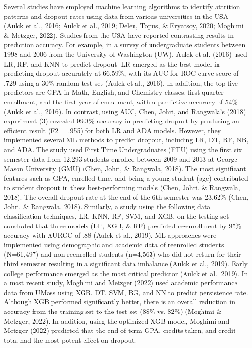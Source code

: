 \documentclass[notitlepage,12pt]{jedm}
\begin{document}
\par Several studies have employed machine learning algorithms to identify attrition patterns and dropout rates using data from various universities in the USA (Aulck et al., 2016; Aulck et al., 2019; Delen, Topus, \& Eryarsoy, 2020; Moghimi \& Metzger, 2022).  Studies from the USA have reported contrasting results in prediction accuracy.  For example, in a survey of undergraduate students between 1998 and 2006 from the University of Washington (UW), Aulck et al. (2016) used LR, RF, and KNN to predict dropout.  LR emerged as the best model in predicting dropout accurately at 66.59\%, with its AUC for ROC curve score of .729 using a 30\% random test set (Aulck et al., 2016).  In addition, the top five predictors are GPA in Math, English, and Chemistry classes, first-quarter enrollment, and the first year of enrollment, with a predictive accuracy of 54\% (Aulck et al., 2016).  In contrast, using AUC, Chen, Johri, and Rangwala’s (2018) experiment (3) revealed 99.3\% accuracy in predicting dropout by producing an efficient result (F2 = .955) for both LR and ADA models.  However, they implemented several ML methods to predict dropout, including LR, DT, RF, NB, and ADA.  The study used First Time Undergraduates (FTU) using the first six semester data from 12,293 students enrolled between 2009 and 2013 at George Mason University (GMU) (Chen, Johri, \& Rangwala, 2018).  The most significant features such as GPA, enrolled time, and being a young student (age) contributed to student dropout in these best-performing models (Chen, Johri, \& Rangwala, 2018).  The overall dropout rate at the end of the 6th semester was 23.62\% (Chen, Johri, \& Rangwala, 2018).  Similarly, a study using the following data classification techniques, LR, KNN, RF, SVM, and XGB, on the testing set concluded that three models (LR, XGB, \& RF) predicted re-enrollment by 95\% accuracy with AUROC of .88  (Aulck et al., 2019).  ML approaches were implemented using demographic and academic data of reenrolled students (N=61,497) and non-reenrolled students (n=4,563) who did not return for their third semester resulting in a significant data imbalance (Aulck et al., 2019).  Early college performance emerged as the most critical predictor (Aulck et al., 2019).  In a most recent study, Moghimi and Metzger (2022) used academic performance data from UMass using XGB, DT, SVM, BG, and NN to predict persistence rate.  Although XGB performed significantly better, there is an overall reduction in accuracy from the training set to the test set (88\% vs. 82\%) (Moghimi \& Metzger, 2022).  In addition, using the optimized XGB model, Moghimi and Metzger (2022) predicted that the end-of-term GPA, credits taken, and credit total had the most potent effect on dropout.   
\end{document}
